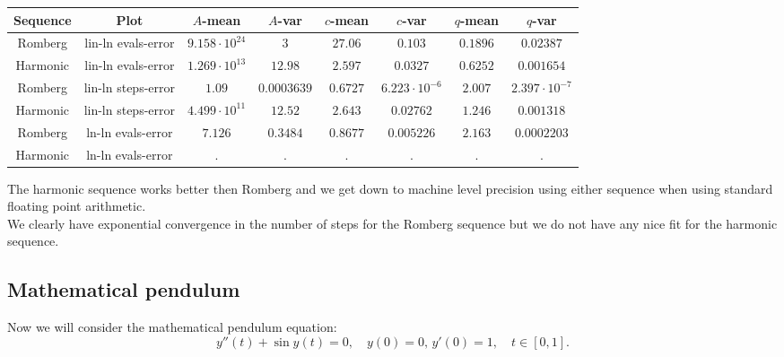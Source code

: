 \begin{table}[H]
    \centering
    \small
     \begin{tabular}{c|c||c|c|c|c|c|c}
Sequence & Plot & \(A\)-mean & \(A\)-var & \(c\)-mean & \(c\)-var & \(q\)-mean & \(q\)-var\\\hline
Romberg & lin-ln evals-error & \(9.158\cdot 10^{24}\) & \(3\) & \(27.06\) & \(0.103\) & \(0.1896\) & \(0.02387\) \\
Harmonic & lin-ln evals-error & \(1.269\cdot 10^{13}\) & \(12.98\) & \(2.597\) & \(0.0327\) & \(0.6252\) & \(0.001654\) \\
Romberg & lin-ln steps-error & \(1.09\) & \(0.0003639\) & \(0.6727\) & \(6.223\cdot 10^{-6}\) & \(2.007\) & \(2.397\cdot 10^{-7}\) \\
Harmonic & lin-ln steps-error & \(4.499\cdot 10^{11}\) & \(12.52\) & \(2.643\) & \(0.02762\) & \(1.246\) & \(0.001318\) \\
Romberg & ln-ln evals-error & \(7.126\) & \(0.3484\) & \(0.8677\) & \(0.005226\) & \(2.163\) & \(0.0002203\) \\
Harmonic & ln-ln evals-error & . & . & . & . & . & . \\
    \end{tabular}
    \label{tab:my_label}
\end{table}

The harmonic sequence works better then Romberg and we get down to machine level precision using either sequence when using standard floating point arithmetic.\\

We clearly have exponential convergence in the number of steps for the Romberg sequence but we do not have any nice fit for the harmonic sequence.

\subsection{Mathematical pendulum}

Now we will consider the mathematical pendulum equation:
\begin{equation}
y''(t) + \sin y(t) = 0,\quad y(0) = 0,\, y'(0) = 1, \quad t\in [0,1].
\end{equation}

